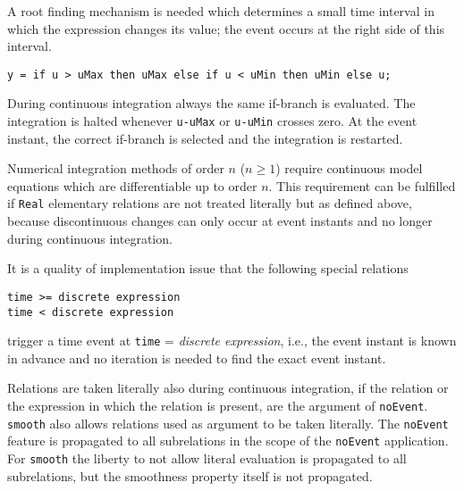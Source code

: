 \begin{nonnormative}
A root finding mechanism is needed which determines a small time interval in which the expression changes its value; the event occurs
at the right side of this interval.
\end{nonnormative}

\begin{example}
\begin{lstlisting}[language=modelica]
y = if u > uMax then uMax else if u < uMin then uMin else u;
\end{lstlisting}

During continuous integration always the same if-branch is
evaluated. The integration is halted whenever \lstinline!u-uMax! or \lstinline!u-uMin!
crosses zero. At the event instant, the correct if-branch is
selected and the integration is restarted.

Numerical integration methods of order $n$ ($n \geq 1$) require continuous model equations which are differentiable up to order $n$.  This requirement can be fulfilled if \lstinline!Real! elementary relations are not treated literally but as defined above, because discontinuous changes can only occur at event instants and no longer during continuous integration.
\end{example}

\begin{nonnormative}
It is a quality of implementation issue that the following special relations
\begin{lstlisting}[language=modelica]
time >= discrete expression
time < discrete expression
\end{lstlisting}
trigger a time event at \lstinline!time! = \emph{discrete expression}, i.e., the
event instant is known in advance and no iteration is needed to find the
exact event instant.
\end{nonnormative}

Relations are taken literally also during continuous integration, if the relation or the expression in which the relation is present, are the argument of \lstinline!noEvent!.  \lstinline!smooth! also allows relations used as argument to be taken literally.  The \lstinline!noEvent! feature is propagated to all subrelations in the scope of the \lstinline!noEvent! application.  For \lstinline!smooth! the liberty to not allow literal evaluation is propagated to all subrelations, but the smoothness property itself is not propagated.

